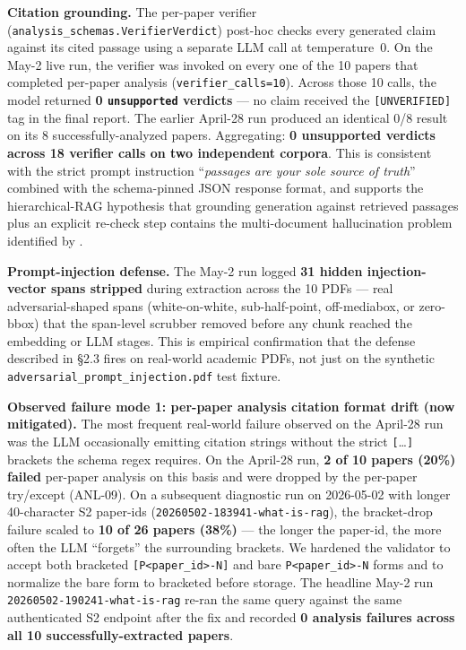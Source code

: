 \documentclass[12pt,a4paper]{article}
\begin{document}
\textbf{Citation grounding.} The per-paper verifier
(\texttt{analysis\_schemas.VerifierVerdict}) post-hoc checks every generated
claim against its cited passage using a separate LLM call at temperature~0. On
the May-2 live run, the verifier was invoked on every one of the 10 papers
that completed per-paper analysis (\texttt{verifier\_calls=10}). Across those
10 calls, the model returned \textbf{0 \texttt{unsupported} verdicts} --- no
claim received the \texttt{[UNVERIFIED]} tag in the final report. The earlier
April-28 run produced an identical 0/8 result on its 8 successfully-analyzed
papers. Aggregating: \textbf{0 unsupported verdicts across 18 verifier calls
on two independent corpora}. This is consistent with the strict prompt
instruction ``\textit{passages are your sole source of truth}'' combined with
the schema-pinned JSON response format, and supports the hierarchical-RAG
hypothesis that grounding generation against retrieved passages plus an
explicit re-check step contains the multi-document hallucination problem
identified by \citet{belem2024multidoc}.

\textbf{Prompt-injection defense.} The May-2 run logged \textbf{31 hidden
injection-vector spans stripped} during extraction across the 10 PDFs --- real
adversarial-shaped spans (white-on-white, sub-half-point, off-mediabox, or
zero-bbox) that the span-level scrubber removed before any chunk reached the
embedding or LLM stages. This is empirical confirmation that the defense
described in \S2.3 fires on real-world academic PDFs, not just on the
synthetic \texttt{adversarial\_prompt\_injection.pdf} test fixture.

\textbf{Observed failure mode 1: per-paper analysis citation format drift
(now mitigated).} The most frequent real-world failure observed on the
April-28 run was the LLM occasionally emitting citation strings without the
strict \texttt{[}\dots\texttt{]} brackets the schema regex requires. On the
April-28 run, \textbf{2 of 10 papers (20\%) failed} per-paper analysis on this
basis and were dropped by the per-paper try/except (ANL-09). On a subsequent
diagnostic run on 2026-05-02 with longer 40-character S2 paper-ids
(\texttt{20260502-183941-what-is-rag}), the bracket-drop failure scaled to
\textbf{10 of 26 papers (38\%)} --- the longer the paper-id, the more often
the LLM ``forgets'' the surrounding brackets. We hardened the validator to
accept both bracketed \texttt{[P<paper\_id>-N]} and bare \texttt{P<paper\_id>-N}
forms and to normalize the bare form to bracketed before storage. The headline
May-2 run \texttt{20260502-190241-what-is-rag} re-ran the same query against
the same authenticated S2 endpoint after the fix and recorded \textbf{0
analysis failures across all 10 successfully-extracted papers}.
\end{document}
